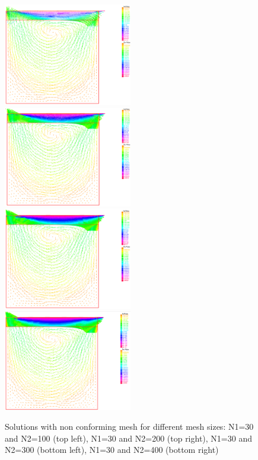 \documentclass{article}
\begin{document}
\begin{figure}[H] \label{fig:sol_nonconf}
	\includegraphics[width=0.5\textwidth]{imgs/solution-NC_100_30.PNG}
	\includegraphics[width=0.5\textwidth]{imgs/solution-NC_200_30.PNG}
	\includegraphics[width=0.5\textwidth]{imgs/solution-NC_300_30.PNG}
	\includegraphics[width=0.5\textwidth]{imgs/solution-NC_400_30.PNG}
	\caption{Solutions with non conforming mesh for different mesh sizes: N1=30 and N2=100 (top left), N1=30 and N2=200 (top right), N1=30 and N2=300 (bottom left), N1=30 and N2=400 (bottom right)}
\end{figure}
\end{document}
